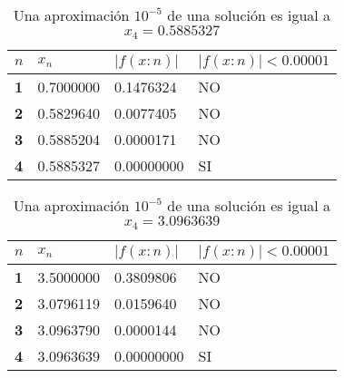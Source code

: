 \begin{enumerate}
	      \begin{table}[h!]
		      \centering
		      \begin{tabular}{@{}llll@{}}
			      \toprule
			      $n$        & \textbf{$x_n$} & \textbf{$\left\lvert f(x:n)\right\rvert $} & \textbf{$\left\lvert f(x:n)\right\rvert<0.00001$} \\ \midrule
			      \textbf{1} & 0.7000000      & 0.1476324                                  & NO                                                \\
			      \textbf{2} & 0.5829640      & 0.0077405                                  & NO                                                \\
			      \textbf{3} & 0.5885204      & 0.0000171                                  & NO                                                \\
			      \textbf{4} & 0.5885327      & 0.00000000                                 & SI                                                \\ \bottomrule
		      \end{tabular}
		      \caption{Una aproximación $10^{-5}$ de una solución es igual a $x_4=0.5885327$}
		      \label{tabfmc19}
	      \end{table}


	      \begin{table}[h!]
		      \centering
		      \begin{tabular}{@{}llll@{}}
			      \toprule
			      $n$        & \textbf{$x_n$} & \textbf{$\left\lvert f(x:n)\right\rvert $} & \textbf{$\left\lvert f(x:n)\right\rvert<0.00001$} \\ \midrule
			      \textbf{1} & 3.5000000      & 0.3809806                                  & NO                                                \\
			      \textbf{2} & 3.0796119      & 0.0159640                                  & NO                                                \\
			      \textbf{3} & 3.0963790      & 0.0000144                                  & NO                                                \\
			      \textbf{4} & 3.0963639      & 0.00000000                                 & SI                                                \\ \bottomrule
		      \end{tabular}
		      \caption{Una aproximación $10^{-5}$ de una solución es igual a $x_4=3.0963639$}
		      \label{tabfmc20}
	      \end{table}
\end{enumerate}

